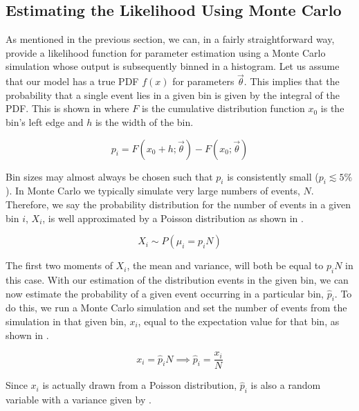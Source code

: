 \subsection{Estimating the Likelihood Using Monte Carlo}


As mentioned in the previous section, we can, in a fairly straightforward way, provide a likelihood function for parameter estimation using a Monte Carlo simulation whose output is subsequently binned in a histogram.  Let us assume that our model has a true PDF $f(x)$ for parameters $\vec{\theta}$.  This implies that the probability that a single event lies in a given bin is given by the integral of the PDF.  This is shown in  where $F$ is the cumulative distribution function $x_0$ is the bin's left edge and $h$ is the width of the bin.  

\begin{equation}
        \label{eqn:gpu_integral_pdf}
        p_i = F(x_0+h; \vec{\theta}) - F(x_0; \vec{\theta})
\end{equation}

Bin sizes may almost always be chosen such that $p_i$ is consistently small ($p_i \lesssim 5\%$).  In Monte Carlo we typically simulate very large numbers of events, $N$.  Therefore, we say the probability distribution for the number of events in a given bin $i$, $X_i$, is well approximated by a Poisson distribution as shown in .

\begin{equation}
        \label{eqn:gpu_poisson_bin}
        X_i \sim P(\mu_i = p_iN)
\end{equation}

The first two moments of $X_i$, the mean and variance, will both be equal to $p_i N$ in this case.  With our estimation of the distribution events in the given bin, we can now estimate the probability of a given event occurring in a particular bin, $\hat{p}_i$.  To do this, we run a Monte Carlo simulation and set the number of events from the simulation in that given bin, $x_i$, equal to the expectation value for that bin, as shown in .


\begin{equation}
        \label{eqn:gpu_expectation_val}
        x_i = \hat{p}_i N \implies \hat{p}_i = \frac{x_i}{N}
\end{equation}


Since $x_i$ is actually drawn from a Poisson distribution, $\hat{p}_i$ is also a random variable with a variance given by .

